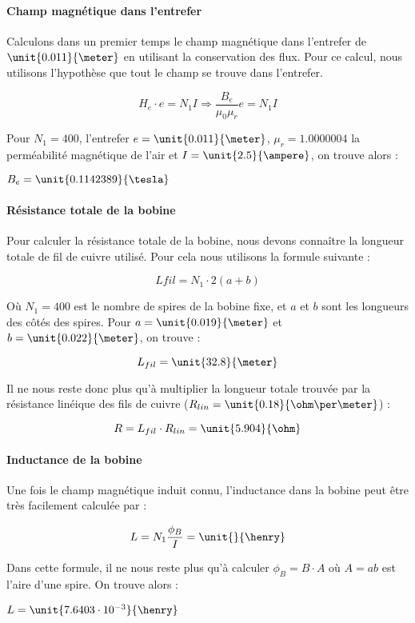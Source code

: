 \paragraph{Champ magnétique dans l'entrefer}
Calculons dans un premier temps le champ magnétique dans l'entrefer de $\unit{0.011}{\meter}$ en 
utilisant la conservation des flux. Pour ce calcul, nous utilisons l'hypothèse que tout le champ
se trouve dans l'entrefer.

$$H_e \cdot e = N_1 I \Rightarrow \frac{B_e}{\mu_0 \mu_r} e = N_1 I$$

Pour $N_1 = 400$, l'entrefer $e = \unit{0.011}{\meter}$, $\mu_r = 1.0000004$ la perméabilité magnétique
de l'air et $I = \unit{2.5}{\ampere}$, on trouve alors :

$B_e = \unit{0.1142389}{\tesla}$

\paragraph{Résistance totale de la bobine}
Pour calculer la résistance totale de la bobine, nous devons connaître la longueur totale de fil de cuivre utilisé.
Pour cela nous utilisons la formule suivante :

$$L{fil} = N_1 \cdot 2(a + b)$$

Où $N_1 = 400$ est le nombre de spires de la bobine fixe, et $a$ et $b$ sont les longueurs des côtés des spires. Pour
$a = \unit{0.019}{\meter}$ et $b = \unit{0.022}{\meter}$, on trouve :

$$L_{fil} = \unit{32.8}{\meter}$$

Il ne nous reste donc plus qu'à multiplier la longueur totale trouvée par la résistance linéique des fils de cuivre
($R_{lin} = \unit{0.18}{\ohm\per\meter}$) :

$$R = L_{fil} \cdot R_{lin} = \unit{5.904}{\ohm}$$

\paragraph{Inductance de la bobine}
Une fois le champ magnétique induit connu, l'inductance dans la bobine peut être très facilement calculée par :

$$L = N_1 \frac{\phi_B}{I} = \unit{}{\henry}$$

Dans cette formule, il ne nous reste plus qu'à calculer $\phi_B = B \cdot A$ où $A = ab$ est l'aire d'une spire.
On trouve alors :

$L = \unit{7.6403 \cdot 10^{-3}}{\henry}$

